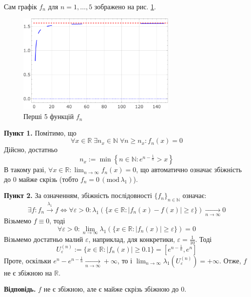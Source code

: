 \documentclass[14pt]{extarticle}
\begin{document}
Сам графік $f_n$ для $n=1,\dots,5$ зображено на рис. \ref{fig:plot}.

\begin{figure}[H]
    \centering
    \includegraphics[width=0.7\textwidth]{images/final_2.png}
    \caption{Перші 5 функцій $f_n$}
    \label{fig:plot}
\end{figure}

\textbf{Пункт 1.} Помітимо, що
\[
\forall x \in \mathbb{R} \; \exists n_x \in \mathbb{N} \; \forall n \geq n_x: f_n(x) = 0
\]
Дійсно, достатньо
\[
n_x := \min\left\{n \in \mathbb{N}: e^{n-\frac{1}{n}} > x\right\}
\]
В такому разі, $\forall x \in \mathbb{R}:\lim_{n \to \infty}f_n(x) = 0$, що автоматично означає збіжність до $0$ майже скрізь (тобто $f_n = 0 \, (\text{mod} \, \lambda_1)$). 

\textbf{Пункт 2.} За означенням, збіжність послідовності $\{f_n\}_{n \in \mathbb{N}}$ означає:
\[
\exists f: f_n \xrightarrow[]{\lambda_1} f \iff \forall \varepsilon > 0: \lambda_1\left(\{x \in \mathbb{R}: |f_n(x)-f(x)| \geq \varepsilon\}\right) \xrightarrow[n \to \infty]{} 0
\]
Візьмемо $f\equiv 0$, тоді
\[
\forall \varepsilon > 0: \lim_{n \to \infty} \lambda_1(\{x \in \mathbb{R}: |f_n(x)| \geq \varepsilon\}) = 0
\]
Візьмемо достатньо малий $\varepsilon$, наприклад, для конкретики, $\varepsilon=\frac{1}{10}$. Тоді
\[
U_{\varepsilon}^{(n)}:=\{x \in \mathbb{R}: |f_n(x)| \geq 0.1\} = [e^{n-\frac{1}{n}},e^n]
\]
Проте, оскільки $e^n-e^{n-\frac{1}{n}}\xrightarrow[n \to \infty]{}+\infty$, то і $\lim_{n \to \infty}\lambda_1(U_{\varepsilon}^{(n)}) = +\infty$. Отже, $f$ не є збіжною на $\mathbb{R}$.

\textbf{Відповідь.} $f$ не є збіжною, але є майже скрізь збіжною до $0$.

\pagebreak
\end{document}

